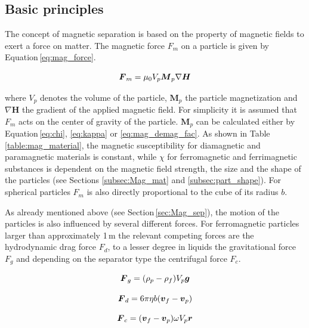 \subsection{Basic principles}
\label{subsec:bas_princ}
The concept of magnetic separation is based on the property of magnetic fields to exert a force on matter. The magnetic force $F_{m}$ on a particle is given by Equation\,\ref{eq:mag_force}.

\begin{equation}
\label{eq:mag_force}
\centering
\boldsymbol{F}_{m} = \mu_{0}V_{p}\boldsymbol{M}_{p}\nabla\boldsymbol{H}
\end{equation}

where $V_{p}$ denotes the volume of the particle, $\boldsymbol{M}_{p}$ the particle magnetization and $\nabla\boldsymbol{H}$ the gradient of the applied magnetic field. For simplicity it is assumed that $F_{m}$ acts on the center of gravity of the particle. $\boldsymbol{M}_{p}$ can be calculated either by Equation\,\ref{eq:chi}, \ref{eq:kappa} or \ref{eq:mag_demag_fac}. As shown in Table\,\ref{table:mag_material}, the magnetic susceptibility for diamagnetic and paramagnetic materials is constant, while $\chi$ for ferromagnetic and ferrimagnetic substances is dependent on the magnetic field strength, the size and the shape of the particles (see Sections \ref{subsec:Mag_mat} and \ref{subsec:part_shape}). For spherical particles $F_{m}$ is also directly proportional to the cube of its radius $b$. 

As already mentioned above (see Section\,\ref{sec:Mag_sep}), the motion of the particles is also influenced by several different  forces. For ferromagnetic particles larger than approximately 1\,\textmu m the relevant competing forces are  the hydrodynamic drag force $F_{d}$, to a lesser degree in liquids the gravitational force $F_{g}$ and depending on the separator type the centrifugal force $F_{c}$.  


\begin{equation}
\label{eq:grav_force}
\centering
\boldsymbol{F}_{g} = (\rho_{p}-\rho_{f})V_{p}\boldsymbol{g}
\end{equation}

\begin{equation}
\label{eq:drag_force}
\centering
\boldsymbol{F}_{d} = 6\pi\eta b(\boldsymbol{v}_{f}-\boldsymbol{v}_{p})
\end{equation}

\begin{equation}
\label{eq:cent_force}
\centering
\boldsymbol{F}_{c} = (\boldsymbol{v}_{f}-\boldsymbol{v}_{p})\omega V_{p}\boldsymbol{r}
\end{equation}

